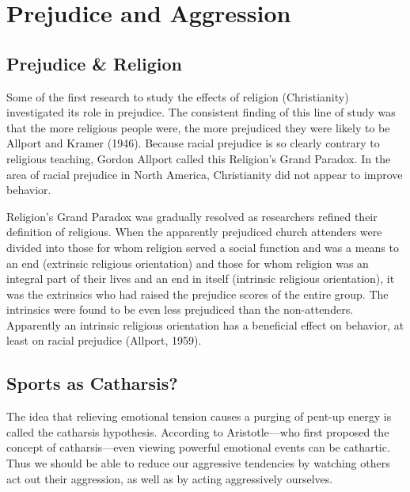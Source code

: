\documentclass[
]{book}
\begin{document}
\hypertarget{prejudice-and-aggression}{%
\section{Prejudice and Aggression}\label{prejudice-and-aggression}}

\hypertarget{prejudice-religion}{%
\subsection*{Prejudice \& Religion}\label{prejudice-religion}}

Some of the first research to study the effects of religion (Christianity) investigated its role in prejudice. The consistent finding of this line of study was that the more religious people were, the more prejudiced they were likely to be Allport and Kramer (1946). Because racial prejudice is so clearly contrary to religious teaching, Gordon Allport called this Religion's Grand Paradox. In the area of racial prejudice in North America, Christianity did not appear to improve behavior.

Religion's Grand Paradox was gradually resolved as researchers refined their definition of religious. When the apparently prejudiced church attenders were divided into those for whom religion served a social function and was a means to an end (extrinsic religious orientation) and those for whom religion was an integral part of their lives and an end in itself (intrinsic religious orientation), it was the extrinsics who had raised the prejudice scores of the entire group. The intrinsics were found to be even less prejudiced than the non-attenders. Apparently an intrinsic religious orientation has a beneficial effect on behavior, at least on racial prejudice (Allport, 1959).

\hypertarget{sports-as-catharsis}{%
\subsection*{Sports as Catharsis?}\label{sports-as-catharsis}}

The idea that relieving emotional tension causes a purging of pent-up energy is called the catharsis hypothesis. According to Aristotle---who first proposed the concept of catharsis---even viewing powerful emotional events can be cathartic. Thus we should be able to reduce our aggressive tendencies by watching others act out their aggression, as well as by acting aggressively ourselves.
\end{document}
